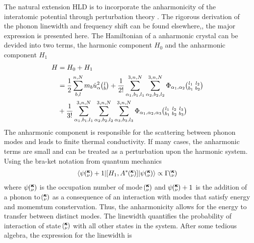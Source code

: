 The natural extension HLD is to incorporate the anharmonicity of the interatomic potential through perturbation theory \cite{turneythesis}. The rigorous derivation of the phonon linewidth and frequency shift can be found elsewhere,\cite{PhysRev.128.2589}, the major expression is presented here. The Hamiltonian of a anharmonic crystal can be devided into two terms, the harmonic component $H_0$ and the anharmonic component $H_1$
%
\begin{equation}\label{EQ:H_anh}
\begin{split}
H&=H_0+H_1\\
&=\frac{1}{2}\sum_{b,l}^{n,N}m_b\dot{u}_\alpha^2 \lb + \frac{1}{2!}\sum_{\alpha_1,b_1,l_1}^{3,n,N}\sum_{\alpha_2,b_2,l_2}^{3,n,N}\Phi_{\alpha_1,\alpha_2} \lblb\\
&+\frac{1}{3!}\sum_{\alpha_1,b_1,l_1}^{3,n,N}\sum_{\alpha_2,b_2,l_2}^{3,n,N}\sum_{\alpha_3,b_3,l_3}^{3,n,N}\Phi_{\alpha_1,\alpha_2,\alpha_3} \lblblb\\
\end{split}
\end{equation}
%
The anharmonic component is responsible for the scattering between phonon modes and leads to finite thermal conductivity. If many cases, the anharmonic terms are small and can be treated as a perturbation upon the harmonic system. Using the bra-ket notation from quantum mechanics
%
\begin{equation}\label{EQ:pert_anh}
\begin{split}
\langle \psi \kv+1 | [H_1,A^*\kv] | \psi \kv\rangle \propto \Gamma \kv
\end{split}
\end{equation}
%
where $\psi \mspace{-4.0mu}\left(\mspace{-8.0mu} \begin{smallmatrix}&\pmb{\kappa} \\&\nu\end{smallmatrix} \mspace{-3.0mu}\right)$ is the occupation number of mode $\mspace{-4.0mu}\left(\mspace{-8.0mu} \begin{smallmatrix}&\pmb{\kappa} \\&\nu\end{smallmatrix} \mspace{-3.0mu}\right)$ and $\psi \mspace{-4.0mu}\left(\mspace{-8.0mu} \begin{smallmatrix}&\pmb{\kappa} \\&\nu\end{smallmatrix} \mspace{-3.0mu}\right)+1$ is the addition of a phonon to $\mspace{-4.0mu}\left(\mspace{-8.0mu} \begin{smallmatrix}&\pmb{\kappa} \\&\nu\end{smallmatrix} \mspace{-3.0mu}\right)$ as a consequence of an interaction with modes that satisfy energy and momemtum constervation. Thus, the anharmonicity allows for the energy to transfer between distinct modes. The linewidth quantifies the probability of interaction of state $\mspace{-4.0mu}\left(\mspace{-8.0mu} \begin{smallmatrix}&\pmb{\kappa} \\&\nu\end{smallmatrix} \mspace{-3.0mu}\right)$ with all other states in the system. After some tedious algebra, the expression for the linewidth is

